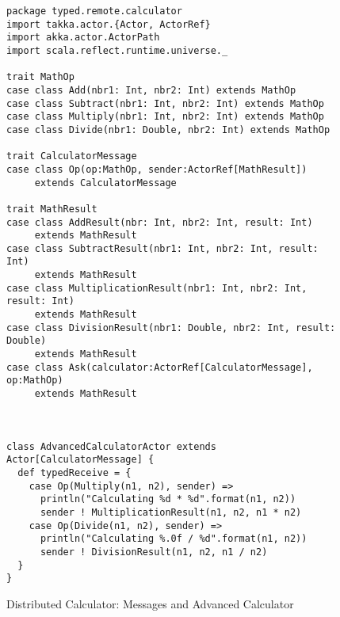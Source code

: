 \begin{figure}[p]
\begin{lstlisting}
package typed.remote.calculator
import takka.actor.{Actor, ActorRef}
import akka.actor.ActorPath
import scala.reflect.runtime.universe._

trait MathOp
case class Add(nbr1: Int, nbr2: Int) extends MathOp
case class Subtract(nbr1: Int, nbr2: Int) extends MathOp
case class Multiply(nbr1: Int, nbr2: Int) extends MathOp
case class Divide(nbr1: Double, nbr2: Int) extends MathOp

trait CalculatorMessage
case class Op(op:MathOp, sender:ActorRef[MathResult])                    
     extends CalculatorMessage
     
trait MathResult
case class AddResult(nbr: Int, nbr2: Int, result: Int)                   
     extends MathResult
case class SubtractResult(nbr1: Int, nbr2: Int, result: Int)                    
     extends MathResult
case class MultiplicationResult(nbr1: Int, nbr2: Int, result: Int)       
     extends MathResult
case class DivisionResult(nbr1: Double, nbr2: Int, result: Double)       
     extends MathResult
case class Ask(calculator:ActorRef[CalculatorMessage], op:MathOp) 
     extends MathResult
     


class AdvancedCalculatorActor extends Actor[CalculatorMessage] {
  def typedReceive = {
    case Op(Multiply(n1, n2), sender) =>
      println("Calculating %d * %d".format(n1, n2))
      sender ! MultiplicationResult(n1, n2, n1 * n2)
    case Op(Divide(n1, n2), sender) =>
      println("Calculating %.0f / %d".format(n1, n2))
      sender ! DivisionResult(n1, n2, n1 / n2)
  }
}
\end{lstlisting}
\caption{Distributed Calculator: Messages and Advanced Calculator}
\label{discal_message}
\end{figure}

